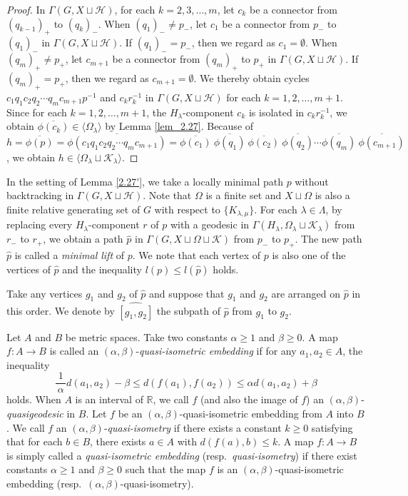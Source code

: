 \documentclass{amsart}
\theoremstyle{definition}
\begin{document}
\begin{proof}
In $\Gamma(G,X\sqcup{\mathcal H})$, for each $k=2,3,\ldots,m$, let $c_k$ be a connector from $(q_{k-1})_+$ to $(q_k)_-$. 
When $(q_1)_-\ne p_-$, let $c_1$ be a connector from $p_-$ to $(q_1)_-$ in $\Gamma(G,X\sqcup {\mathcal H})$. 
If $(q_1)_-=p_-$, then we regard as $c_1=\emptyset$. 
When $(q_m)_+\ne p_+$, let $c_{m+1}$ be a connector from $(q_m)_+$ to $p_+$ in $\Gamma(G,X\sqcup {\mathcal H})$. 
If $(q_m)_+=p_+$, then we regard as $c_{m+1}=\emptyset$. 
We thereby obtain cycles $c_1q_1c_2q_2\cdots q_mc_{m+1}p^{-1}$ and $c_kr_k^{-1}$ in $\Gamma(G, X\sqcup{\mathcal H})$ for each $k=1,2,\ldots,m+1$. 
Since for each $k=1,2,\ldots,m+1$, the $H_\lambda$-component $c_k$ is isolated in $c_kr_k^{-1}$, we obtain $\overline{\phi(c_k)}\in \langle \Omega_\lambda\rangle$ by Lemma \ref{lem_2.27}. 
Because of $h=\overline{\phi(p)}=\overline{\phi(c_1q_1c_2q_2\cdots q_mc_{m+1})}=\overline{\phi(c_1)}\ \overline{\phi(q_1)}\ \overline{\phi(c_2)}\ \overline{\phi(q_2)}\cdots \overline{\phi(q_m)}\ \overline{\phi(c_{m+1})}$, we obtain $h\in \langle \Omega_\lambda\sqcup {\mathcal K}_\lambda\rangle$.
\end{proof}

In the setting of Lemma \ref{2.27'}, we take a locally minimal path $p$ without backtracking in $\Gamma(G, X\sqcup {\mathcal H})$. 
Note that $\Omega$ is a finite set and $X\sqcup\Omega$ is also a finite relative generating set of $G$ with respect to $\{K_{\lambda,\mu}\}$. 
For each $\lambda\in\Lambda$, by replacing every $H_\lambda$-component $r$ of $p$ with a geodesic in $\Gamma(H_\lambda,\Omega_\lambda\sqcup {\mathcal K}_\lambda)$ from $r_-$ to $r_+$, we obtain a path $\widehat{p}$ in $\Gamma(G, X\sqcup \Omega\sqcup {\mathcal K})$ from $p_-$ to $p_+$. 
The new path $\widehat p$ is called a {\it minimal lift} of $p$. 
We note that each vertex of $p$ is also one of the vertices of $\widehat{p}$ and the inequality $l(p)\le l(\widehat{p})$ holds. 

Take any vertices $g_1$ and $g_2$ of $\widehat{p}$ and suppose that $g_1$ and $g_2$ are arranged on $\widehat{p}$ in this order. 
We denote by $\widehat{[g_1,g_2]}$ the subpath of $\widehat{p}$ from $g_1$ to $g_2$. 

Let $A$ and $B$ be metric spaces. 
Take two constants $\alpha \geq 1$ and $\beta \geq 0$. 
A map $f \colon A \to B$ is called an $(\alpha,\beta)$-{\it quasi-isometric embedding} if for any $a_1,a_2\in A$, the inequality 
$$
\frac{1}{\,\alpha \,}d(a_1,a_2)-\beta \leq d(f(a_1),f(a_2)) \leq \alpha d(a_1,a_2)+\beta
$$
holds. 
When $A$ is an interval of $\mathbb R$, we call $f$ (and also the image of $f$) an $(\alpha,\beta)$-{\it quasigeodesic} in $B$. 
Let $f$ be an $(\alpha,\beta)$-quasi-isometric embedding from $A$ into $B$. 
We call $f$ an $(\alpha,\beta)$-{\it quasi-isometry} if there exists a constant $k\geq 0$ satisfying that for each $b\in B$, there exists $a\in A$ with $d(f(a),b)\leq k$. 
A map $f \colon A \to B$ is simply called a {\it quasi-isometric embedding} (resp.\ {\it quasi-isometry}) if there exist constants $\alpha\geq 1$ and $\beta\geq 0$ such that the map $f$ is an $(\alpha,\beta)$-quasi-isometric embedding (resp.\ $(\alpha,\beta)$-quasi-isometry). 
\end{document}
